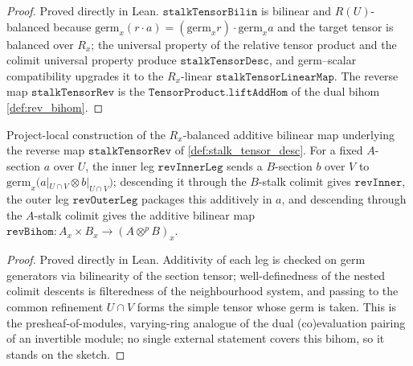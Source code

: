 \begin{proof}
  Proved directly in Lean. \(\mathtt{stalkTensorBilin}\) is bilinear and
  \(R(U)\)-balanced because \(\mathrm{germ}_x(r\cdot a) = (\mathrm{germ}_x r)\cdot
  \mathrm{germ}_x a\) and the target tensor is balanced over \(R_x\); the universal
  property of the relative tensor product and the colimit universal property produce
  \(\mathtt{stalkTensorDesc}\), and germ--scalar compatibility upgrades it to the
  \(R_x\)-linear \(\mathtt{stalkTensorLinearMap}\). The reverse map
  \(\mathtt{stalkTensorRev}\) is the \(\mathtt{TensorProduct.liftAddHom}\) of the dual
  bihom \cref{def:rev_bihom}.
\end{proof}

\begin{definition}
  \label{def:rev_bihom}
  Project-local construction of the \(R_x\)-balanced additive bilinear map underlying the
  reverse map \(\mathtt{stalkTensorRev}\) of \cref{def:stalk_tensor_desc}. For a fixed
  \(A\)-section \(a\) over \(U\), the inner leg \(\mathtt{revInnerLeg}\) sends a
  \(B\)-section \(b\) over \(V\) to \(\mathrm{germ}_x\bigl(a|_{U\cap V} \otimes
  b|_{U\cap V}\bigr)\); descending it through the \(B\)-stalk colimit gives
  \(\mathtt{revInner}\), the outer leg \(\mathtt{revOuterLeg}\) packages this additively in
  \(a\), and descending through the \(A\)-stalk colimit gives the additive bilinear map
  \(\mathtt{revBihom}\colon A_x \times B_x \to (A \otimes^{p} B)_x\).
\end{definition}
\begin{proof}
  Proved directly in Lean. Additivity of each leg is checked on germ generators via
  bilinearity of the section tensor; well-definedness of the nested colimit descents is
  filteredness of the neighbourhood system, and passing to the common refinement
  \(U\cap V\) forms the simple tensor whose germ is taken. This is the
  presheaf-of-modules, varying-ring analogue of the dual (co)evaluation pairing of an
  invertible module; no single external statement covers this bihom, so it stands on the
  sketch.
\end{proof}

